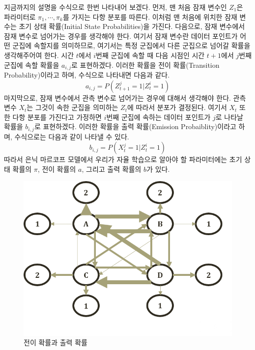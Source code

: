 \documentclass[a4paper]{oblivoir}
\begin{document}
지금까지의 설명을 수식으로 한번 나타내어 보겠다. 먼저, 맨 처음 잠재 변수인 $Z_1$은 파라미터로 $\pi_1,\cdots,\pi_k$를 가지는 다항 분포를 따른다. 이처럼 맨 처음에 위치한 잠재 변수는 초기 상태 확률(Initial State Probabilities)을 가진다. 다음으로, 잠재 변수에서 잠재 변수로 넘어가는 경우를 생각해야 한다. 여기서 잠재 변수란 데이터 포인트가 어떤 군집에 속할지를 의미하므로, 여기서는 특정 군집에서 다른 군집으로 넘어갈 확률을 생각해주어여 한다. 시간 $t$에서 $i$번째 군집에 속할 때 다음 시점인 시간 $t+1$에서 $j$번째 군집에 속할 확률을 $a_{i,j}$로 표현하겠다. 이러한 확률을 전이 확률(Transition Probability)이라고 하며, 수식으로 나타내면 다음과 같다. 
\begin{equation}
a_{i,j} = P(Z_{t+1}^j=1|Z_{t}^i=1)
\label{eq:9-1}
\end{equation}
마지막으로, 잠재 변수에서 관측 변수로 넘어가는 경우에 대해서 생각해야 한다. 관측 변수 $X_t$는 그것이 속한 군집을 의미하는 $Z_t$에 따라서 분포가 결정된다. 여기서 $X_t$ 또한 다항 분포를 가진다고 가정하면 $i$번째 군집에 속하는 데이터 포인트가 $j$로 나타날 확률을 $b_{i,j}$로 표현하겠다. 이러한 확률을 출력 확률(Emission Probaiblity)이라고 하며, 수식으로는 다음과 같이 나타낼 수 있다.     
\begin{equation}
b_{i,j} = P(X_{t}^j=1|Z_{t}^i=1)
\label{eq:9-2}
\end{equation}
따라서 은닉 마르코프 모델에서 우리가 자율 학습으로 알아야 할 파라미터에는 초기 상태 확률의 $\pi$, 전이 확률의 $a$, 그리고 출력 확률의 $b$가 있다. \\

\begin{figure}[ht] \centering 
\includegraphics[scale=0.7]{fig9_7.png} 
\caption{전이 확률과 출력 확률}
\label{fig:9-7}
\end{figure}
\end{document}
